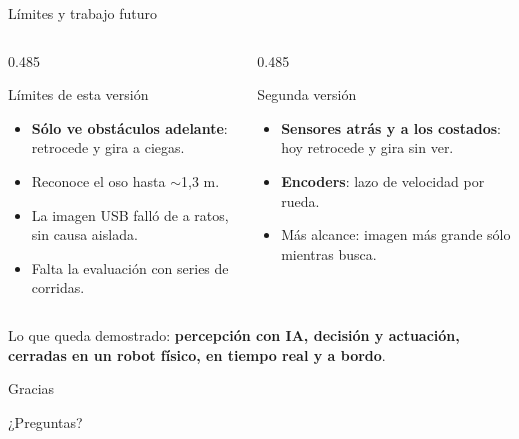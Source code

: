 \documentclass[aspectratio=169,11pt]{beamer}
\newcommand{\destaca}[1]{\textcolor{azul}{\textbf{#1}}}
\begin{document}
\begin{frame}{Límites y trabajo futuro}
  \begin{columns}[T,onlytextwidth]
    \begin{column}{0.485\textwidth}
      \begin{alertblock}{Límites de esta versión}
        \begin{itemize}
          \item \textbf{Sólo ve obstáculos adelante}: retrocede y gira a
                ciegas.
          \item Reconoce el oso hasta $\sim$1,3 m.
          \item La imagen USB falló de a ratos, sin causa aislada.
          \item Falta la evaluación con series de corridas.
        \end{itemize}
      \end{alertblock}
    \end{column}
    \begin{column}{0.485\textwidth}
      \begin{block}{Segunda versión}
        \begin{itemize}
          \item \textbf{Sensores atrás y a los costados}: hoy retrocede y
                gira sin ver.
          \item \textbf{Encoders}: lazo de velocidad por rueda.
          \item Más alcance: imagen más grande sólo mientras busca.
        \end{itemize}
      \end{block}
    \end{column}
  \end{columns}

  \vspace{0.6em}
  \small
  Lo que queda demostrado: \destaca{percepción con IA, decisión y actuación,
  cerradas en un robot físico, en tiempo real y a bordo}.
\end{frame}

\begin{frame}[standout]
  Gracias

  \vspace{0.6em}
  {\large ¿Preguntas?}
\end{frame}

\appendix
{}
\setcounter{ultimaprincipal}{\value{framenumber}}
\end{document}
